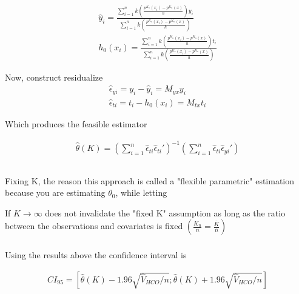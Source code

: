 \documentclass[12pt]{article}
\begin{document}
\begin{gather*}
\hat{y}_i = \frac{\sum\limits_{i=1}^{n} k\left(\frac{p^{K_n}(x_i) - p^{K_n}(x)}{h}\right) y_i}{\sum\limits_{i=1}^{n} k\left(\frac{p^{K_n}(x_i) - p^{K_n}(x)}{h}\right)} \\
h_0(x_i) = \frac{\sum\limits_{i=1}^{n} k\left(\frac{p^{K_n}(x_i) - p^{K_n}(x)}{h}\right) t_i}{\sum\limits_{i=1}^{n} k\left(\frac{p^{K_n}(x_i) - p^{K_n}(x)}{h}\right)}
\end{gather*}

Now, construct residualize
\begin{gather*}
\hat{\epsilon}_{yi} = y_i - \hat{y}_i = M_{yx}y_i \\
\hat{\epsilon}_{ti} = t_i - h_0(x_i)   = M_{tx}t_i
\end{gather*}

Which produces the feasible estimator

\begin{gather*}
\hat{\theta}(K) = \left( \sum\limits_{i=1}^n \hat{\epsilon}_{ti} \hat{\epsilon}_{ti}' \right)^{-1} \left( \sum\limits_{i=1}^n \hat{\epsilon}_{ti} \hat{\epsilon}_{yi}' \right)
\end{gather*}


\subsection{}
\subsubsection{}
Fixing K, the reason this approach is called a "flexible parametric" estimation because you are estimating $\theta_0$, while letting

If $K\rightarrow\infty$ does not invalidate the "fixed K" assumption as long as the ratio between the observations and covariates is fixed $\left( \frac{K_n}{n} = \frac{\bar{K}}{\bar{n}}   \right)$

\subsubsection{}
Using the results above the confidence interval is

\begin{gather*}
CI_{95} = \left[\hat{\theta}(K)  - 1.96  \sqrt{\hat{V}_{HCO} / n}  ; \hat{\theta}(K) + 1.96  \sqrt{\hat{V}_{HCO} / n} \right]
\end{gather*}

\subsection{}
\end{document}
